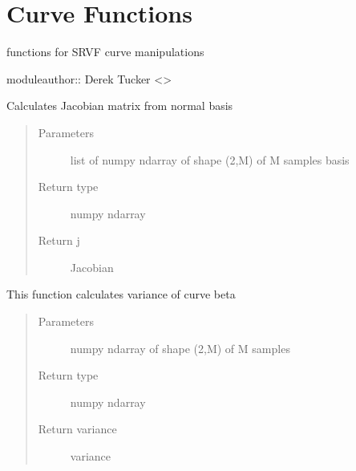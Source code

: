 \documentclass[letterpaper,10pt,english]{sphinxmanual}
\begin{document}
\chapter{Curve Functions}
\label{\detokenize{curve_functions:module-curve_functions}}\label{\detokenize{curve_functions:curve-functions}}\label{\detokenize{curve_functions::doc}}
functions for SRVF curve manipulations

moduleauthor:: Derek Tucker \textless{}\textgreater{}

\begin{fulllineitems}
\label{\detokenize{curve_functions:curve_functions.calc_j}}
Calculates Jacobian matrix from normal basis
\begin{quote}\begin{description}
\item[{Parameters}] \leavevmode
{} \textendash{} list of numpy ndarray of shape (2,M) of M samples basis

\item[{Return type}] \leavevmode
numpy ndarray

\item[{Return j}] \leavevmode
Jacobian

\end{description}\end{quote}

\end{fulllineitems}


\begin{fulllineitems}
\label{\detokenize{curve_functions:curve_functions.calculate_variance}}
This function calculates variance of curve beta
\begin{quote}\begin{description}
\item[{Parameters}] \leavevmode
{} \textendash{} numpy ndarray of shape (2,M) of M samples

\item[{Return type}] \leavevmode
numpy ndarray

\item[{Return variance}] \leavevmode
variance

\end{description}\end{quote}

\end{fulllineitems}
\end{document}
